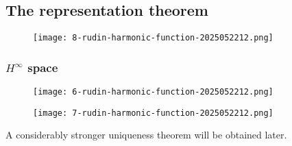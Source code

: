 \subsection{The representation theorem}

\begin{figure}[H]
\centering
\texttt{[image: 8-rudin-harmonic-function-2025052212.png]}
\label{}
\end{figure}

\subsubsection{\texorpdfstring{$H^{\infty}$}{H^infty} space}

\begin{figure}[H]
\centering
\texttt{[image: 6-rudin-harmonic-function-2025052212.png]}
\label{}
\end{figure}

\begin{figure}[H]
\centering
\texttt{[image: 7-rudin-harmonic-function-2025052212.png]}
\label{}
\end{figure}

A considerably stronger uniqueness theorem will be obtained later.
